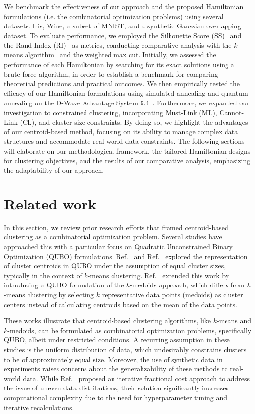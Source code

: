 \documentclass[showpacs,twocolumn,superscriptaddress]{revtex4-2}
\begin{document}
We benchmark the effectiveness of our approach and the proposed Hamiltonian formulations (i.e. the combinatorial optimization problems) using several datasets: Iris, Wine, a subset of MNIST, and a synthetic Gaussian overlapping dataset. To evaluate performance, we employed the Silhouette Score (SS)~\cite{rousseeuw1987silhouettes} and the Rand Index (RI)~\cite{rand1971objective} as metrics, conducting comparative analysis with the $k$-means algorithm~\cite{pedregosa2011scikit} and the weighted max cut. Initially, we assessed the performance of each Hamiltonian by searching for its exact solutions using a brute-force algorithm, in order to establish a benchmark for comparing theoretical predictions and practical outcomes. We then empirically tested the efficacy of our Hamiltonian formulations using simulated annealing and quantum annealing on the D-Wave Advantage System 6.4~\cite{dwave6.4}. Furthermore, we expanded our investigation to constrained clustering, incorporating Must-Link (ML), Cannot-Link (CL), and cluster size constraints. By doing so, we highlight the advantages of our centroid-based method, focusing on its ability to manage complex data structures and accommodate real-world data constraints. The following sections will elaborate on our methodological framework, the tailored Hamiltonian designs for clustering objectives, and the results of our comparative analysis, emphasizing the adaptability of our approach.

\section{Related work}
\label{sec:related}

In this section, we review prior research efforts that framed centroid-based clustering as a combinatorial optimization problem. Several studies have approached this with a particular focus on Quadratic Unconstrained Binary Optimization (QUBO) formulations.
Ref.~\cite{bauckhage2018ising} and Ref.~\cite{arthur2021balanced} explored the representation of cluster centroids in QUBO under the assumption of equal cluster sizes, typically in the context of $k$-means clustering. Ref.~\cite{bauckhage2019qubo} extended this work by introducing a QUBO formulation of the $k$-medoids approach, which differs from $k$-means clustering by selecting $k$ representative data points (medoids) as cluster centers instead of calculating centroids based on the mean of the data points.

These works illustrate that centroid-based clustering algorithms, like $k$-means and $k$-medoids, can be formulated as combinatorial optimization problems, specifically QUBO, albeit under restricted conditions. A recurring assumption in these studies is the uniform distribution of data, which undesirably constrains clusters to be of approximately equal size. Moreover, the use of synthetic data in experiments raises concerns about the generalizability of these methods to real-world data. While Ref.~\cite{matsumoto2022distance} proposed an iterative fractional cost approach to address the issue of uneven data distributions, their solution significantly increases computational complexity due to the need for hyperparameter tuning and iterative recalculations.
\end{document}
